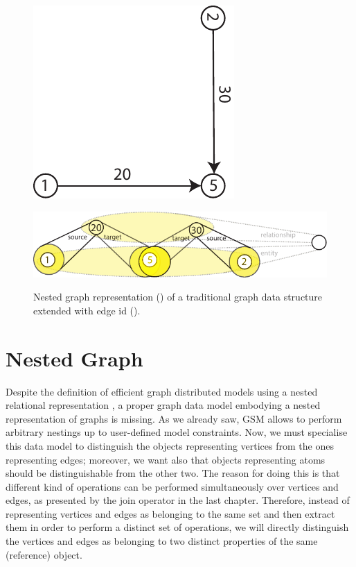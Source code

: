 \begin{figure}[!t]
	\centering
	\begin{minipage}{0.3\textwidth}
		\centering
		\includegraphics[scale=0.6]{fig/04model/05graphs}
		\label{subfig:traditionalgraphtoNest}
	\end{minipage}\qquad \begin{minipage}{0.6\textwidth}
		\centering
		\includegraphics[scale=0.8]{fig/04model/05nested}
		\label{subfig:nestedreprofgraph}
	\end{minipage}
	\caption{Nested graph representation () of a traditional graph data structure extended with edge id ().}
	\label{subfig:representableGraphs}
\end{figure}
\section{Nested Graph}\label{def:ngraph}
Despite the definition of efficient graph distributed models using a nested relational representation \cite{Labouseur2015}, a proper graph data model embodying a nested representation of graphs is missing. As we already saw, GSM allows to perform arbitrary nestings up to user-defined model constraints. Now, we must specialise this data model to distinguish the objects representing vertices from the ones representing edges; moreover, we want also that objects representing atoms should be distinguishable from the other two. The reason for doing this is that different kind of operations can be performed simultaneously over vertices and edges, as presented by the join operator in the last chapter. Therefore, instead of representing vertices and edges as belonging to the same set and then extract them in order to perform a distinct set of operations, we will directly distinguish the vertices and edges as belonging to two distinct properties of the same (reference) object.

